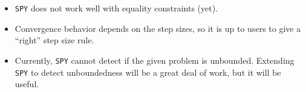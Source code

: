 \begin{itemize}
\item \verb'SPY' does not work well with equality constraints (yet).
\item Convergence behavior depends on the step sizes, so it is up to users to give a ``right'' step size rule.
\item Currently, \verb'SPY' cannot detect if the given problem is unbounded. Extending \verb'SPY' to detect unboundedness will be a great deal of work, but it will be useful.
\end{itemize}
